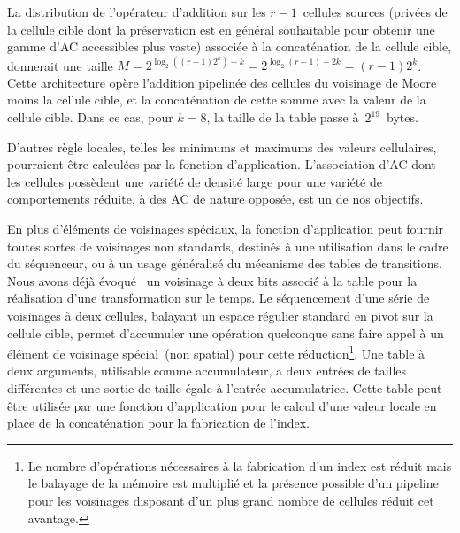 La distribution de l'opérateur d'addition sur les $r - 1$~cellules
sources (privées de la cellule cible dont la préservation est en
général souhaitable pour obtenir une gamme d'AC accessibles plus
vaste) associée à la concaténation de la cellule cible,
donnerait une taille
$M = 2^{\log_{2}((r - 1) 2^{k}) + k} = 2^{\log_{2}(r - 1) + 2k} = (r-1)2^{k}$. %
Cette architecture opère l'addition pipelinée des cellules du
voisinage de Moore moins la cellule cible, et la concaténation de
cette somme avec la valeur de la cellule cible. %
Dans ce cas, pour $k = 8$, la taille de la table passe à~$2^{19}$~bytes. %

D'autres règle locales, telles les minimums et maximums des
valeurs cellulaires, pourraient être calculées par la fonction
d'application. %
L'association d'AC dont les cellules possèdent une variété de densité
large pour une variété de comportements réduite, à des AC de nature
opposée, est un de nos objectifs. %

En plus d'éléments de voisinages spéciaux, la fonction d'application
peut fournir toutes sortes de voisinages non standards, destinés à une
utilisation dans le cadre du séquenceur, ou à un usage généralisé du
mécanisme des tables de transitions. %
Nous avons déjà évoqué~ un voisinage à deux
bits associé à la table  pour la réalisation d'une transformation
sur le temps. %
Le séquencement d'une série de voisinages à deux cellules, balayant un
espace régulier standard en pivot sur la cellule cible, permet
d'accumuler une opération quelconque sans faire appel à un élément de
voisinage spécial~(non spatial) pour cette
réduction\footnote{%
  Le nombre d'opérations nécessaires à la fabrication d'un index est
  réduit mais le balayage de la mémoire est multiplié et la présence
  possible d'un pipeline pour les voisinages disposant d'un plus grand
  nombre de cellules réduit cet avantage.}. %
Une table à deux arguments, utilisable comme accumulateur, a deux
entrées de tailles différentes et une sortie de taille égale à
l'entrée accumulatrice. %
Cette table peut être utilisée par une fonction d'application pour le
calcul d'une valeur locale en place de la concaténation pour la
fabrication de l'index. %


